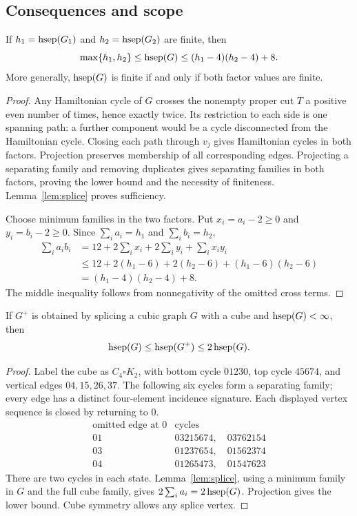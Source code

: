 \subsection{Consequences and scope}
\begin{corollary}
\label{cor:scalar}
If $h_1=\operatorname{hsep}(G_1)$ and $h_2=\operatorname{hsep}(G_2)$ are finite, then
\begin{equation}\label{eq:scalar}
 \max\{h_1,h_2\}\le\operatorname{hsep}(G)\le(h_1-4)(h_2-4)+8.
\end{equation}
More generally, $\operatorname{hsep}(G)$ is finite if and only if both factor values are finite.
\end{corollary}
\begin{proof}
Any Hamiltonian cycle of $G$ crosses the nonempty proper cut $T$ a positive
even number of times, hence exactly twice. Its restriction to each side is
one spanning path: a further component would be a cycle disconnected from
the Hamiltonian cycle. Closing each path through $v_j$ gives Hamiltonian
cycles in both factors. Projection preserves membership of all corresponding
edges. Projecting a separating family and removing duplicates gives separating
families in both factors, proving the lower bound and the necessity of finiteness.
Lemma~\ref{lem:splice} proves sufficiency.

Choose minimum families in the two factors. Put $x_i=a_i-2\ge0$ and
$y_i=b_i-2\ge0$. Since $\sum_i a_i=h_1$ and $\sum_i b_i=h_2$,
\begin{align*}
 \sum_i a_i b_i
 &=12+2\sum_i x_i+2\sum_i y_i+\sum_i x_i y_i\\
 &\le12+2(h_1-6)+2(h_2-6)+(h_1-6)(h_2-6)\\
 &=(h_1-4)(h_2-4)+8.
\end{align*}
The middle inequality follows from nonnegativity of the omitted cross terms.
\end{proof}

\begin{corollary}\label{cor:cube}
If $G^+$ is obtained by splicing a cubic graph $G$ with a cube and
$\operatorname{hsep}(G)<\infty$, then
\[
 \operatorname{hsep}(G)\le\operatorname{hsep}(G^+)\le2\operatorname{hsep}(G).
\]
\end{corollary}
\begin{proof}
Label the cube as $C_4\square K_2$, with bottom cycle $01230$, top cycle
$45674$, and vertical edges $04,15,26,37$. The following six cycles form a
separating family; every edge has a distinct four-element incidence signature.
Each displayed vertex sequence is closed by returning to 0.
\[
\begin{array}{c|l}
\text{omitted edge at 0}&\text{cycles}\\\hline
01&03215674,\quad03762154\\
03&01237654,\quad01562374\\
04&01265473,\quad01547623
\end{array}
\]
There are two cycles in each state. Lemma~\ref{lem:splice}, using a minimum
family in $G$ and the full cube family, gives $2\sum_i a_i=2\operatorname{hsep}(G)$.
Projection gives the lower bound. Cube symmetry allows any splice vertex.
\end{proof}

